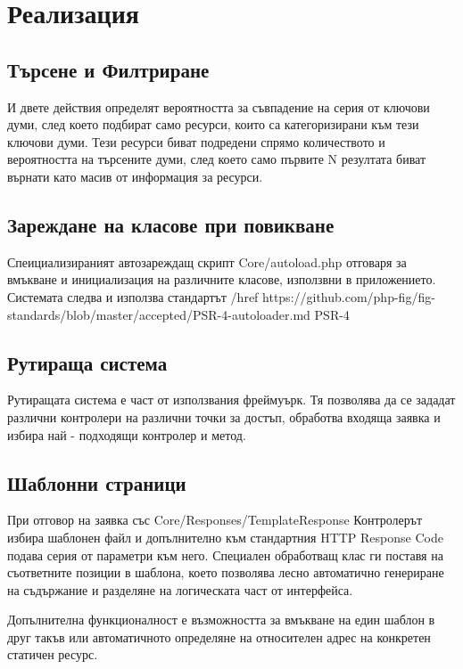 \chapter{Реализация}



\section{Търсене и Филтриране}

И двете действия определят вероятността за съвпадение на
серия от ключови думи, след което подбират само ресурси,
които са категоризирани към тези ключови думи. Тези
ресурси биват подредени спрямо количеството и
вероятността на търсените думи, след което само първите
N резултата биват върнати като масив от информация за
ресурси.


\section{Зареждане на класове при повикване}

Спеициализираният автозареждащ скрипт Core/autoload.php
отговаря за вмъкване и инициализация на различните
класове, използвни в приложението. Системата следва
и използва стандартът /href
    {https://github.com/php-fig/fig-standards/blob/master/accepted/PSR-4-autoloader.md}
    {PSR-4}


\section{Рутираща система}

Рутиращата система е част от използвания фреймуърк.
Тя позволява да се зададат различни контролери на различни
точки за достъп, обработва входяща заявка и избира
най - подходящи контролер и метод.


\section{Шаблонни страници}

При отговор на заявка със Core/Responses/TemplateResponse
Контролерът избира шаблонен файл и допълнително към
стандартния HTTP Response Code подава серия от
параметри към него. Специален обработващ клас ги
поставя на съответните позиции в шаблона, което позволява
лесно автоматично генериране на съдържание и разделяне на
логическата част от интерфейса.

Допълнителна функционалност е възможността за вмъкване
на един шаблон в друг такъв или автоматичното определяне
на относителен адрес на конкретен статичен ресурс.

